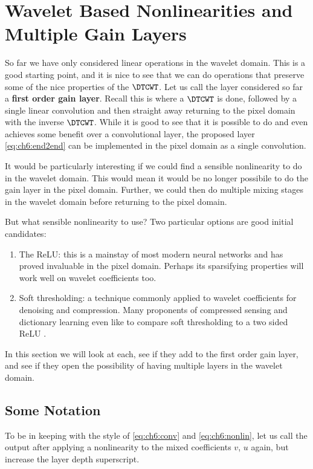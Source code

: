 \section{Wavelet Based Nonlinearities and Multiple Gain Layers}
So far we have only considered linear operations in the wavelet domain. This is
a good starting point, and it is nice to see that we can do operations that
preserve some of the nice properties of the $\DTCWT$. Let us call the layer
considered so far a \textbf{first order gain layer}. Recall this is where a
$\DTCWT$ is done, followed by a single linear convolution and then straight away
returning to the pixel domain with the inverse $\DTCWT$. While it is good to see
that it is possible to do and even achieves some benefit over a convolutional
layer, the proposed layer \eqref{eq:ch6:end2end} can be implemented in the pixel domain
as a single convolution.

It would be particularly interesting if we could find a sensible nonlinearity to
do in the wavelet domain. This would mean it would be no longer possibile to do the
gain layer in the pixel domain. Further, we could then do multiple mixing
stages in the wavelet domain before returning to the pixel domain.

But what sensible nonlinearity to use? Two particular options are good initial
candidates:
\begin{enumerate}
  \item The ReLU: this is a mainstay of most modern neural networks and has
    proved invaluable in the pixel domain. Perhaps its sparsifying properties
    will work well on wavelet coefficients too. 
  \item Soft thresholding: a technique commonly applied to wavelet
    coefficients for denoising and compression. Many proponents of compressed
    sensing and dictionary learning even like to compare soft thresholding to a
    two sided ReLU \cite{papyan_theoretical_2018, papyan_convolutional_2016}.
\end{enumerate}

In this section we will look at each, see if they add to the first order gain
layer, and see if they open the possibility of having multiple layers in the
wavelet domain. 

\subsection{Some Notation}
To be in keeping with the style of \eqref{eq:ch6:conv} and
\eqref{eq:ch6:nonlin}, let us call the output after applying a nonlinearity to
the mixed coefficients $v$, $u$ again, but increase the layer depth superscript. 

